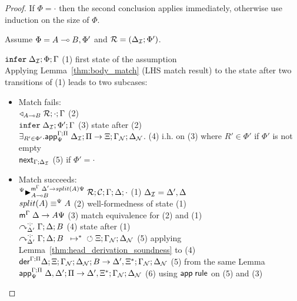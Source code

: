 \begin{proof}
If $\Phi = \cdot$ then the second conclusion applies immediately, otherwise use
induction on the size of $\Phi$.

Assume $\Phi = A \lolli B, \Phi'$ and $\rulestk = (\deltan; \Phi')$.

$\dostate{\deltan}{\Phi}{\Gamma}{\Pi}$ \hfill (1) first state of the assumption \\

Applying Lemma~\ref{thm:body_match} (LHS match result) to the state after two
transitions of (1) leads to two subcases:

\begin{itemize}[leftmargin=*]
   \item Match fails: \\
   $\contstate{A \lolli B}{\rulestk}{\cdot}{\Gamma}$ \hfill (2) \\
   $\dostate{\deltan}{\Phi'}{\Gamma}{\Pi}$ \hfill (3) state after (2) \\

   $\exists_{R' \in \Phi'}. \az{\Psi}{\Gamma}{\deltan}{\Pi}{R'}{\Xi; \gammanew;
   \deltanew}$. \hfill (4) i.h. on (3) where $R' \in \Phi'$ if $\Phi'$ is
   not empty \\

   $\failstate{\Gamma}{\deltan}$ \hfill (5) if $\Phi' = \cdot$ \\

   \item Match succeeds: \\

   $\matstateb{A \lolli B}{\rulestk}{\lstack{C}}{\Gamma}{\Delta}{\cdot}{\Delta'
      \rightarrow split(A)\Psi}{\Psi}$ \hfill (1) $\deltan = \Delta', \Delta$ \\

   $\feqa{split(A)}{A}{\Psi}{\Psi}$ \hfill (2) well-formedness of state (1) \\

   $\mz{\Gamma}{\Delta}{A\Psi}$ \hfill (3) match equivalence for (2) and (1) \\

   $\derstatex{\Gamma}{\Delta}{\Delta'}{\cdot}{\cdot}{B}$ \hfill (4) state
   after (1) \\

   $\transs{\derstatex{\Gamma}{\Delta}{\Delta'}{\cdot}{\cdot}{B}}{\finalstate{\Xi}{\gammanew}{\deltanew}}$
   \hfill (5) applying Lemma~\ref{thm:head_derivation_soundness} to (4) \\

   $\dz{\Gamma}{\Pi}{\Delta}{\Xi}{\gammanew}{\deltanew}{B}{\Delta', \Xi^{*}; \gammanew; \deltanew}$ \hfill (5) from the
      same Lemma \\

      $\az{\Psi}{\Gamma}{\Delta, \Delta'}{\Pi}{A \lolli B}{\Delta', \Xi^{*}; \gammanew;
      \deltanew}$ \hfill (6) using $\azname \m{rule}$ on (5) and (3) \\

\end{itemize}

\end{proof}
